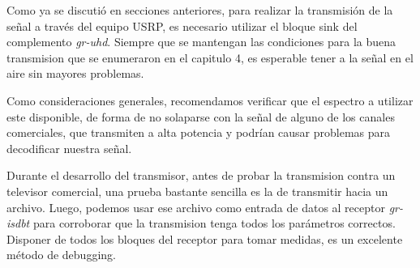 Como ya se discutió en secciones anteriores, para realizar la transmisión de la señal a través del equipo USRP, es necesario utilizar el bloque sink del complemento \textit{gr-uhd}. Siempre que se mantengan las condiciones para la buena transmision que se enumeraron en el capitulo 4, es esperable tener a la señal en el aire sin mayores problemas. 

Como consideraciones generales, recomendamos verificar que el espectro a utilizar este disponible, de forma de no solaparse con la señal de alguno de los canales comerciales, que transmiten a alta potencia y podrían causar problemas para decodificar nuestra señal.

Durante el desarrollo del transmisor, antes de probar la transmision contra un televisor comercial, una prueba bastante sencilla es la de transmitir hacia un archivo. Luego, podemos usar ese archivo como entrada de datos al receptor \textit{gr-isdbt} para corroborar que la transmision tenga todos los parámetros correctos. Disponer de todos los bloques del receptor para tomar medidas, es un excelente método de debugging.